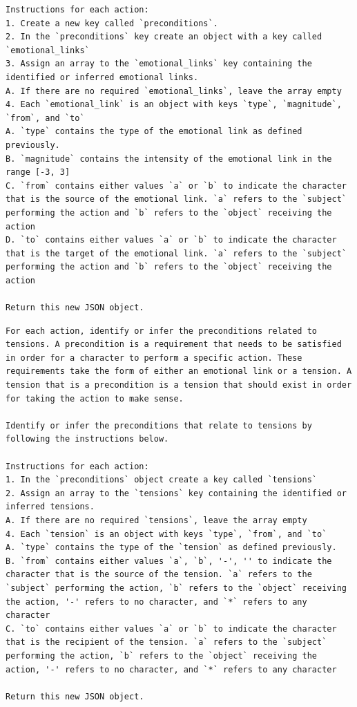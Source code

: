 \documentclass[phd,electronic,oneside,twosidetoc,letterpaper,chaptercenter,parttop,lof]{byumsphd}
\begin{document}
\begin{lstlisting}[style=mypromptstyle, caption={Emotional preconditions prompt}, label={lst:emotional_preconditions}]
Instructions for each action:
1. Create a new key called `preconditions`.
2. In the `preconditions` key create an object with a key called `emotional_links`
3. Assign an array to the `emotional_links` key containing the identified or inferred emotional links.
A. If there are no required `emotional_links`, leave the array empty
4. Each `emotional_link` is an object with keys `type`, `magnitude`, `from`, and `to`
A. `type` contains the type of the emotional link as defined previously.
B. `magnitude` contains the intensity of the emotional link in the range [-3, 3]
C. `from` contains either values `a` or `b` to indicate the character that is the source of the emotional link. `a` refers to the `subject` performing the action and `b` refers to the `object` receiving the action
D. `to` contains either values `a` or `b` to indicate the character that is the target of the emotional link. `a` refers to the `subject` performing the action and `b` refers to the `object` receiving the action

Return this new JSON object.

\end{lstlisting}

\vspace{-6pt}
\begin{lstlisting}[style=mypromptstyle, caption={Prompt to extract tension preconditions}, label={lst:tension_preconditions}]
For each action, identify or infer the preconditions related to tensions. A precondition is a requirement that needs to be satisfied in order for a character to perform a specific action. These requirements take the form of either an emotional link or a tension. A tension that is a precondition is a tension that should exist in order for taking the action to make sense.

Identify or infer the preconditions that relate to tensions by following the instructions below.

Instructions for each action:
1. In the `preconditions` object create a key called `tensions`
2. Assign an array to the `tensions` key containing the identified or inferred tensions.
A. If there are no required `tensions`, leave the array empty
4. Each `tension` is an object with keys `type`, `from`, and `to`
A. `type` contains the type of the `tension` as defined previously.
B. `from` contains either values `a`, `b`, '-', '' to indicate the character that is the source of the tension. `a` refers to the `subject` performing the action, `b` refers to the `object` receiving the action, '-' refers to no character, and `*` refers to any character
C. `to` contains either values `a` or `b` to indicate the character that is the recipient of the tension. `a` refers to the `subject` performing the action, `b` refers to the `object` receiving the action, '-' refers to no character, and `*` refers to any character
	
Return this new JSON object.

\end{lstlisting}
\end{document}
